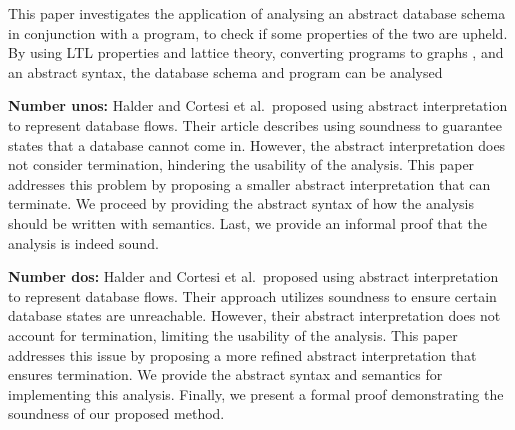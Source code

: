 This paper investigates the application of analysing an abstract database schema in conjunction with a program, to check if some properties of the two are upheld.
By using LTL properties and lattice theory, converting programs to graphs , and an abstract syntax, the database schema and program can be analysed


\begin {abstract}
    Halder and Cortesi et al.\ have shown that abstract interpretation can be used to analyse the behavior of database queries.
    Some of the issues that are found in some of these already existing papers are failure to terminate, or the analysis is not precise enough.
    This paper presents a novel approach to the abstract interpretation of database queries.
    The abstract interpretation is based on the abstract semantics of the database queries, which are defined in terms of abstract domains.
    The abstract domains are used to represent the possible values of the database queries, and the abstract interpretation is used to analyse the possible behaviors of the database queries.
    This paper also presents a new way of representing strings in the form af regular expressions, which allows for a more precise analysis of the database queries, as well as integer values represented as intervals.
\end{abstract}


\textbf{Number unos:}
Halder and Cortesi et al.\ proposed using abstract interpretation to represent database flows.
Their article describes using soundness to guarantee states that a database cannot come in.
However, the abstract interpretation does not consider termination, hindering the usability of the analysis.
This paper addresses this problem by proposing a smaller abstract interpretation that can terminate.
We proceed by providing the abstract syntax of how the analysis should be written with semantics.
Last, we provide an informal proof that the analysis is indeed sound.

\textbf{Number dos:}
Halder and Cortesi et al.\ proposed using abstract interpretation to represent database flows.
Their approach utilizes soundness to ensure certain database states are unreachable.
However, their abstract interpretation does not account for termination, limiting the usability of the analysis.
This paper addresses this issue by proposing a more refined abstract interpretation that ensures termination.
We provide the abstract syntax and semantics for implementing this analysis.
Finally, we present a formal proof demonstrating the soundness of our proposed method.

